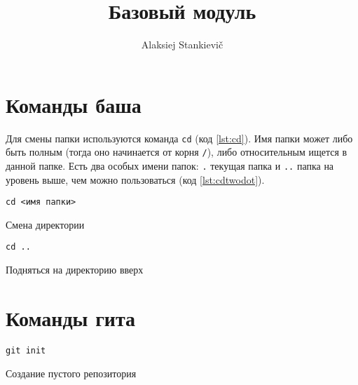 \documentclass[12pt]{article}
\author{Alaksiej Stankievič}
\title{Базовый модуль}
\begin{document}

\section{Команды баша}
Для смены папки используются команда \verb|cd| (код \ref{lst:cd}). Имя папки может либо быть полным (тогда оно начинается от корня \verb|/|), либо относительным ищется в данной папке. Есть два особых имени папок: \verb|.| текущая папка и \verb|..| папка на уровень выше, чем можно пользоваться (код \ref{lst:cdtwodot}). 
\begin{listing}[ht]
\begin{center}
\begin{verbatim}
cd <имя папки>
\end{verbatim}
\end{center}
\caption{Смена директории}
\label{lst:cd}
\end{listing}

\begin{listing}[ht]
\begin{center}
\begin{verbatim}
cd ..
\end{verbatim}
\end{center}
\caption{Подняться на директорию вверх}
\label{lst:cdtwodot}
\end{listing}

\section{Команды гита}


\begin{listing}[ht]
\begin{center}
\begin{verbatim}
git init
\end{verbatim}
\end{center}
\caption{Создание пустого репозитория}
\label{lst:gitinit}
\end{listing}
\end{document}
